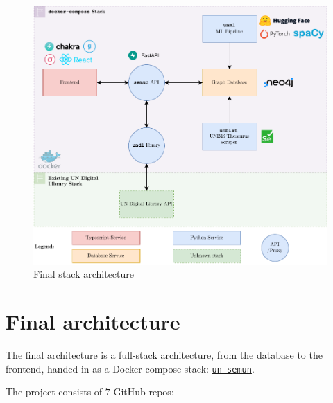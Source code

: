
\begin{figure}[!htb]
    \centering
    \includegraphics[width=\textwidth]{res/architecture-final.pdf}
    \caption{Final stack architecture}

    \label{fig:architecture}
\end{figure}

\section{Final architecture} \label{sec:final-architecture}

The final architecture is a full-stack architecture, from the database to the frontend, handed in as a Docker compose stack: \href{https://github.com/ClementSicard/un-semun}{\faGithub{} \texttt{un-semun}}.

The project consists of $7$ \faGithub{} GitHub repos:

